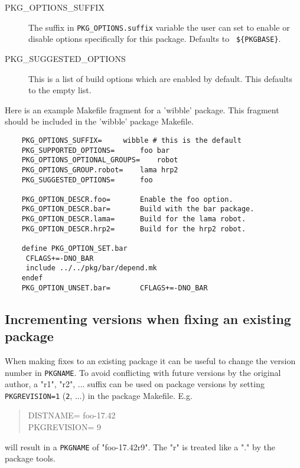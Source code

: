 \begin{description}
   \smallbreak
   \item[PKG\_OPTIONS\_SUFFIX]
   The suffix in {\tt PKG\_OPTIONS.suffix} variable the user can set to enable
   or disable options specifically for this package. Defaults to {\tt
   \$\{PKGBASE\}}.

   \smallbreak
   \item[PKG\_SUGGESTED\_OPTIONS]
   This is a list of build options which are enabled by default. This defaults
   to the empty list.

\end{description}

Here is an example Makefile fragment for a 'wibble' package. This fragment
should be included in the 'wibble' package Makefile.

\begin{verbatim}
	PKG_OPTIONS_SUFFIX=		wibble # this is the default
	PKG_SUPPORTED_OPTIONS=		foo bar
	PKG_OPTIONS_OPTIONAL_GROUPS=	robot
	PKG_OPTIONS_GROUP.robot=	lama hrp2
	PKG_SUGGESTED_OPTIONS=		foo

	PKG_OPTION_DESCR.foo=		Enable the foo option.
	PKG_OPTION_DESCR.bar=		Build with the bar package.
	PKG_OPTION_DESCR.lama=		Build for the lama robot.
	PKG_OPTION_DESCR.hrp2=		Build for the hrp2 robot.

	define PKG_OPTION_SET.bar
	 CFLAGS+=-DNO_BAR
	 include ../../pkg/bar/depend.mk
	endef
	PKG_OPTION_UNSET.bar=		CFLAGS+=-DNO_BAR
\end{verbatim}

\subsection{Incrementing versions when fixing an existing package} %
\label{section:genvars:PKGREVISION}

When making fixes to an existing package it can be useful to change the version
number in {\tt PKGNAME}. To avoid conflicting with future versions by the
original author, a "r1", "r2", ... suffix can be used on package versions by
setting {\tt PKGREVISION=1} ({\tt 2}, ...) in the package Makefile. E.g.
\begin{quote}
   DISTNAME=             foo-17.42\\
   PKGREVISION=          9
\end{quote}
will result in a {\tt PKGNAME} of "foo-17.42r9". The "r" is treated like a "."
by the package tools.

